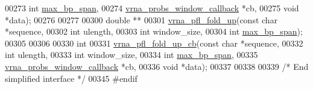 \begin{DoxyCode}
00273                  \textcolor{keywordtype}{int}                        \hyperlink{group__model__details_ga18df869af0d70101106458fc3f027806}{max\_bp\_span},
00274                  \hyperlink{group__part__func__window_gabe710a1182e6db69cc75329dfc9bed67}{vrna\_probs\_window\_callback} *cb,
00275                  \textcolor{keywordtype}{void}                       *data);
00276 
00277 
00300 \textcolor{keywordtype}{double} **
00301 \hyperlink{group__part__func__window_ga1dd5c51b797c961124912e289bff553a}{vrna\_pfl\_fold\_up}(\textcolor{keyword}{const} \textcolor{keywordtype}{char} *sequence,
00302                  \textcolor{keywordtype}{int}        ulength,
00303                  \textcolor{keywordtype}{int}        window\_size,
00304                  \textcolor{keywordtype}{int}        \hyperlink{group__model__details_ga18df869af0d70101106458fc3f027806}{max\_bp\_span});
00305 
00306 
00330 \textcolor{keywordtype}{int}
00331 \hyperlink{group__part__func__window_gac3251d3da0238d6d9ffdd6703b00f1d3}{vrna\_pfl\_fold\_up\_cb}(\textcolor{keyword}{const} \textcolor{keywordtype}{char}                  *sequence,
00332                     \textcolor{keywordtype}{int}                         ulength,
00333                     \textcolor{keywordtype}{int}                         window\_size,
00334                     \textcolor{keywordtype}{int}                         \hyperlink{group__model__details_ga18df869af0d70101106458fc3f027806}{max\_bp\_span},
00335                     \hyperlink{group__part__func__window_gabe710a1182e6db69cc75329dfc9bed67}{vrna\_probs\_window\_callback}  *cb,
00336                     \textcolor{keywordtype}{void}                        *data);
00337 
00338 
00339 \textcolor{comment}{/* End simplified interface */}
00345 \textcolor{preprocessor}{#endif}
\end{DoxyCode}
